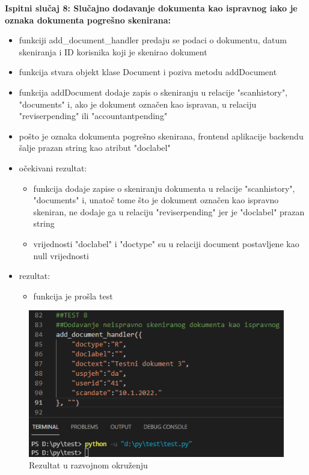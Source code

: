 	\textbf{Ispitni slučaj 8: Slučajno dodavanje dokumenta kao ispravnog iako je oznaka dokumenta pogrešno skenirana:}\\
\begin{itemize}
	\item funkciji add\_document\_handler predaju se podaci o dokumentu, datum skeniranja i ID korisnika koji je skenirao dokument
	\item funkcija stvara objekt klase Document i poziva metodu addDocument
	\item funkcija addDocument dodaje zapis o skeniranju u relacije "scanhistory", "documents" i, ako je dokument označen kao ispravan, u relaciju "reviserpending" ili "accountantpending"
	\item pošto je oznaka dokumenta pogrešno skenirana, frontend aplikacije backendu šalje prazan string kao atribut "doclabel"
	
	\item očekivani rezultat:\\
	\begin{itemize}
		\item funkcija dodaje zapise o skeniranju dokumenta u relacije "scanhistory", "documents" i, unatoč tome što je dokument označen kao ispravno skeniran, ne dodaje ga u relaciju "reviserpending" jer je "doclabel" prazan string
		\item vrijednosti "doclabel" i "doctype" su u relaciji document postavljene kao null vrijednosti
	\end{itemize}
	\item rezultat:
	\begin{itemize}
		\item funkcija je prošla test
	\end{itemize}
\end{itemize}
\begin{figure}[H]
	\centering
	\includegraphics[scale=0.5]{./slike/rez8.png}
	\caption{Rezultat u razvojnom okruženju}
	\label{fig:REZ8}
\end{figure}
